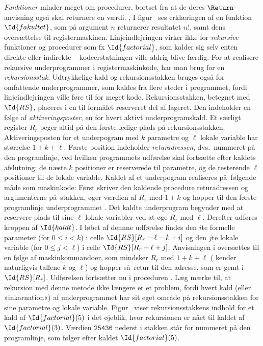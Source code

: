 \emph{Funktioner} minder meget om procedurer, bortset fra at de deres $\Return$-anvisning også skal returnere en værdi. 
,
I figur~ ses erklæringen af en funktion $\Id{fakultet}$, som på argument $n$ returnerer resultatet $n!$, samt dens oversættelse til registermaskinen.
Linjeindlejringen virker ikke for \emph{rekursive} funktioner og procedurer som fx $\Id{factorial}$, som kalder sig selv enten direkte eller indirekte  -- kode\-erstatningen ville aldrig blive færdig.
For at realisere rekursive underprogrammer i registermaskinkode, har man brug for en
\emph{rekursionsstak}.
Udtrykkelige kald og rekursionsstakken bruges også for omfattende underprogrammer, som kaldes fra flere steder i programmet, fordi linjeindlejringen ville føre til for meget kode.
Rekursionsstakken, betegnet med $\Id{RS}$, placeres i en til formålet reserveret del af lageret.
Den indeholder en følge af 
\emph{aktiveringsposter}, en for hvert aktivt underprogramskald.
Et særligt register $R_r$ peger altid på den første ledige plads på rekursionsstakken.
Aktiveringsposten for et underpogram med $k$ parametre og $\ell$ lokale variable har størrelse $1 + k + \ell$.
Første position indeholder \emph{returadressen}, dvs.\ nummeret på den programlinje, ved hvilken programmets udførelse skal fortsætte efter kaldets afslutning;
de næste $k$ positioner er reserverede til parametre, og de resterende $\ell$ positioner til de lokale variable.
Kaldet af et underpogram realiseres på følgende måde som maskinkode:
Først skriver den kaldende procedure  returadressen og argumenterne på stakken, øger værdien af $R_r$ med $1+k$ og hopper til den første programlinje underprogrammet .
Det kaldte underprogram begynder med at reservere plads til sine $\ell$ lokale variabler ved at øge $R_r$ med $\ell$.
Derefter udføres kroppen af $\Id{kaldt}$.
I løbet af dennne udførelse findes den $i$te formelle parameter (for $0 \le i < k$) i celle $\Id{RS}[R_r - \ell - k + i]$ og den $j$te lokale variable (for $0 \le j < \ell$) i celle $\Id{RS}[R_r - \ell  + j]$.
Anvisningen \Return  i  oversættes til en følge af maskinkommandoer, som mindsker $R_r$ med $1 + k + \ell$ ( kender naturligvis tallene $k$ og $\ell$) og hopper så retur til den adresse, som er gemt i  $\Id{RS}[R_r]$.
Udførelsen fortsætter nu i proceduren .
Læg mærke til, at rekursion med denne metode ikke længere er et problem, fordi hvert kald (eller »inkarnation«) af underprogrammet har sit eget område på rekursionsstakken for sine parametre og lokale variable.
Figur~ viser rekursionsstakkens indhold
for et kald af $\Id{factorial}(5)$ i det øjeblik, hvor rekursionen er nået til kaldet af $\Id{factorial}(3)$.
Værdien $\mathtt{25436}$ nederst i stakken står for nummeret på den programlinje, som følger efter kaldet $\Id{factorial}(5)$. 



